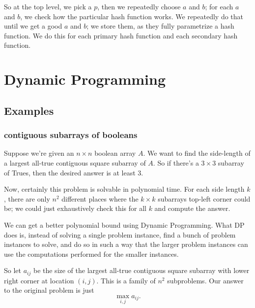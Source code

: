\documentclass{article}
\begin{document}
So at the top level, we pick a $p$, then we repeatedly choose $a$ and $b$; for each
$a$ and $b$, we check how the particular hash function works.
We repeatedly do that until we get a good $a$ and $b$; we store them,
as they fully parametrize a hash function.
We do this for each primary hash function and each secondary hash function.





\section{Dynamic Programming}

\subsection{Examples}

\subsubsection{contiguous subarrays of booleans}
Suppose we're given an $n\times n$ boolean array $A$.
We want to find the side-length of a largest all-true contiguous square
subarray of $A$.
So if there's a $3\times 3$ subarray of Trues, then the desired answer
is at least 3.

Now, certainly this problem is solvable in polynomial time.
For each side length $k$, there are only $n^2$ different places where the
$k\times k$ subarrays top-left corner could be; we could
just exhaustively check this for all $k$ and compute the answer.

We can get a better polynomial bound using Dynamic Programming.
What DP does is, instead of solving a single problem instance, find a bunch
of problem instances to solve, and do so in such a way that the larger
problem instances can use the computations performed for the smaller
instances.

So let $a_{ij}$ be the size of the largest all-true contiguous
square subarray with lower right corner
at location $(i,j)$.
This is a family of $n^2$ subproblems.
Our answer to the original problem is just
$$
\max_{i,j} a_{ij}.
$$
\end{document}
